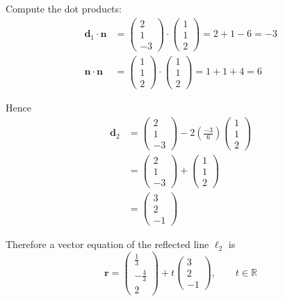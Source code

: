 \documentclass[leqno]{article}
\begin{document}
\begin{enumerate}[
  label=\textbf{\arabic*.},
  leftmargin=*,
  topsep=0pt,
  partopsep=0pt,
  parsep=0pt
]
\begin{tcolorbox}[colback=white, colframe=scarlet, title={\textbf{Solution}}, breakable, grow to left by=6mm, grow to right by=10mm]
Compute the dot products:
\begin{align*}
\mathbf d_1\cdot \mathbf n&=
\begin{pmatrix}2\\1\\-3\end{pmatrix}\cdot
\begin{pmatrix}1\\1\\2\end{pmatrix}
=2+1-6=-3\\
\mathbf n\cdot \mathbf n&=
\begin{pmatrix}1\\1\\2\end{pmatrix}\cdot
\begin{pmatrix}1\\1\\2\end{pmatrix}
=1+1+4=6
\end{align*}

Hence
\begin{align*}
\mathbf d_2
&=
\begin{pmatrix}2\\1\\-3\end{pmatrix}
-2\left(\frac{-3}{6}\right)
\begin{pmatrix}1\\1\\2\end{pmatrix}\\
&=
\begin{pmatrix}2\\1\\-3\end{pmatrix}
+\begin{pmatrix}1\\1\\2\end{pmatrix}\\
&=
\begin{pmatrix}3\\2\\-1\end{pmatrix}
\end{align*}

Therefore a vector equation of the reflected line \(\ell_2\) is
\[
\mathbf r=
\begin{pmatrix}\frac13\\-\frac43\\2\end{pmatrix}
+t\begin{pmatrix}3\\2\\-1\end{pmatrix},
\qquad t\in\mathbb{R}
\]


\end{tcolorbox}
\end{enumerate}
\end{document}
